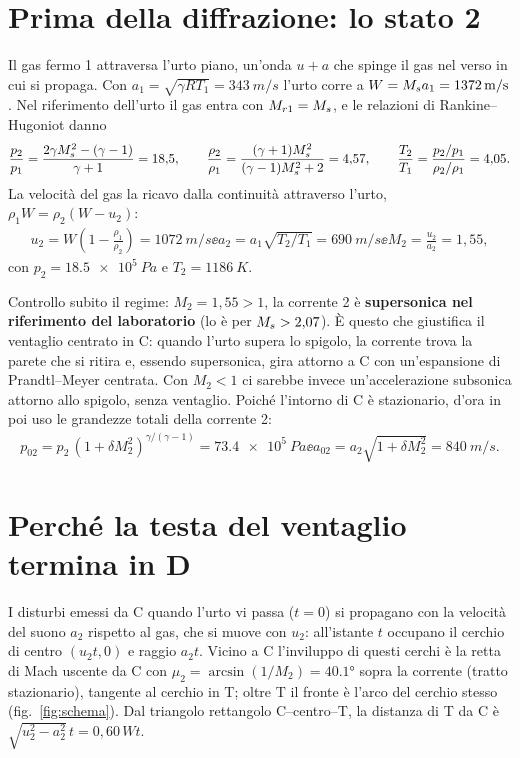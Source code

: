 \section*{Prima della diffrazione: lo stato 2}
Il gas fermo 1 attraversa l'urto piano, un'onda $u+a$ che spinge il gas nel verso in cui si propaga. Con
$a_1=\sqrt{\gamma RT_1}=\SI{343}{m/s}$ l'urto corre a $W=M_{s} a_1=\SI{1372}{m/s}$. Nel riferimento dell'urto il gas
entra con $M_{r1}=M_{s}$, e le relazioni di Rankine--Hugoniot danno
\begin{gather*}
\frac{p_2}{p_1}=\frac{2\gamma M_{s}^2-(\gamma-1)}{\gamma+1}=18{,}5 ,\qquad
\frac{\rho_2}{\rho_1}=\frac{(\gamma+1)M_{s}^2}{(\gamma-1)M_{s}^2+2}=4{,}57 ,\qquad
\frac{T_2}{T_1}=\frac{p_2/p_1}{\rho_2/\rho_1}=4{,}05 .
\end{gather*}
La velocità del gas la ricavo dalla continuità attraverso l'urto, $\rho_1W=\rho_2(W-u_2)$:
\begin{gather*}
u_2=W\left(1-\frac{\rho_1}{\rho_2}\right)=\SI{1072}{m/s} \ee
a_2=a_1\sqrt{T_2/T_1}=\SI{690}{m/s} \ee M_2=\frac{u_2}{a_2}=1{,}55,
\end{gather*}
con $p_2=\SI{18.5e5}{Pa}$ e $T_2=\SI{1186}{K}$.

Controllo subito il regime: $M_2=1{,}55>1$, la corrente 2 è \textbf{supersonica nel riferimento del laboratorio}
(lo è per $M_{s}>2{,}07$). È questo che giustifica il ventaglio centrato in C: quando l'urto supera lo spigolo, la
corrente trova la parete che si ritira e, essendo supersonica, gira attorno a C con un'espansione di Prandtl--Meyer
centrata. Con $M_2<1$ ci sarebbe invece un'accelerazione subsonica attorno allo spigolo, senza ventaglio. Poiché
l'intorno di C è stazionario, d'ora in poi uso le grandezze totali della corrente 2:
\begin{gather*}
p_{02}=p_2\,(1+\delta M_2^2)^{\gamma/(\gamma-1)}=\SI{73.4e5}{Pa} \ee a_{02}=a_2\sqrt{1+\delta M_2^2}=\SI{840}{m/s}.
\end{gather*}

\section*{Perché la testa del ventaglio termina in D}
I disturbi emessi da C quando l'urto vi passa ($t=0$) si propagano con la velocità del suono $a_2$ rispetto al gas,
che si muove con $u_2$: all'istante $t$ occupano il cerchio di centro $(u_2t,0)$ e raggio $a_2t$. Vicino a C
l'inviluppo di questi cerchi è la retta di Mach uscente da C con $\mu_2=\arcsin(1/M_2)=\ang{40.1}$ sopra la corrente
(tratto stazionario), tangente al cerchio in T; oltre T il fronte è l'arco del cerchio stesso (fig.~\ref{fig:schema}).
Dal triangolo rettangolo C--centro--T, la distanza di T da C è $\sqrt{u_2^2-a_2^2}\,t=0{,}60\,Wt$.

